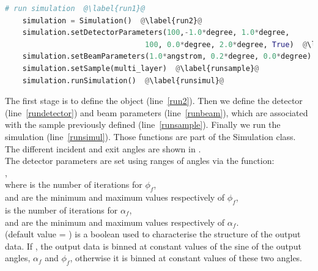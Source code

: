 \begin{lstlisting}[language=python, style=eclipseboxed,name=ex1,nolol]
    # run simulation  @\label{run1}@
    simulation = Simulation()  @\label{run2}@
    simulation.setDetectorParameters(100,-1.0*degree, 1.0*degree, 
                                100, 0.0*degree, 2.0*degree, True)  @\label{rundetector}@
    simulation.setBeamParameters(1.0*angstrom, 0.2*degree, 0.0*degree)  @\label{runbeam}@
    simulation.setSample(multi_layer)  @\label{runsample}@
    simulation.runSimulation()  @\label{runsimul}@
\end{lstlisting}


\noindent The first stage is to define the  object (line~\ref{run2}). Then we define the detector (line~\ref{rundetector}) and beam
parameters (line~\ref{runbeam}), which are associated with the
sample previously defined (line~\ref{runsample}). Finally we run
the simulation (line~\ref{runsimul}). Those functions are part of the Simulation
class.  The
different incident and exit angles are
shown in . \\

\noindent The detector parameters are set using ranges of angles via
the function:\\

\noindent {}, \\

\noindent where  is the number of iterations for $\phi_f$,\\  and 
are the minimum and maximum values respectively of $\phi_f$, \\  is
the number of iterations for $\alpha_f$,\\  and  
are the minimum and maximum values respectively of
$\alpha_f$. \\
 (default value = ) is a boolean
used to characterise the structure of the output data. If
, the output data is binned at constant
values of the sine of the output angles, $\alpha_f$ and $\phi_f$, otherwise it is binned
at constant values of these two angles.\\


